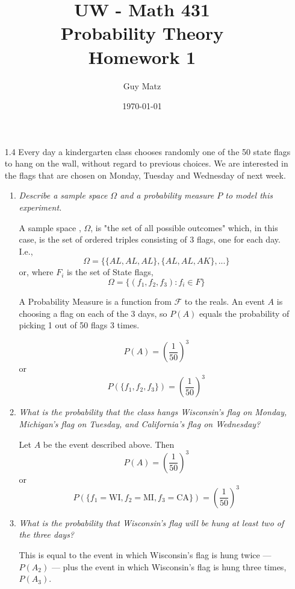 \documentclass[10pt]{article}
\title{UW - Math 431 \\
Probability Theory \\
Homework 1}
\author{Guy Matz}
\date{\today}
\begin{document}
\maketitle

\begin{itemize}

\item[1.4] Every day a kindergarten class chooses randomly one of the 50 state flags to hang on the wall, without regard to previous choices. We are interested in the flags that are chosen on Monday, Tuesday and Wednesday of next week.

  \begin{enumerate}
    \item \textit{Describe a sample space $\Omega$ and a probability
        measure $P$ to model this experiment.}

      A sample space , $\Omega$, is "the set of all possible
      outcomes" which, in this case, is the set of ordered triples
      consisting of 3 flags, one for each day. I.e.,
        \[ \Omega = \{\{AL, AL, AL\}, \{AL, AL, AK\}, ... \} \]
      or, where $F_i$ is the set of State flags,
      \[ \Omega = \{ ( f_1, f_2, f_3): f_i \in F \}  \]

      A Probability Measure is a function from $\mathcal{F}$ to the
      reals.  An event $A$ is choosing a flag on each of the 3 days,
      so $P(A)$ equals the probability of picking 1 out of 50 flags 3
      times.

        \[ P(A) = \left( \frac{1}{50} \right)^3 \]
        or
        \[ P(\{f_1, f_2, f_3\}) = \left( \frac{1}{50} \right)^3 \]

    \item \textit{What is the probability that the class hangs Wisconsin's flag
          on Monday, Michigan's flag on Tuesday, and California's flag on
        Wednesday?}

      Let $A$ be the event described above.  Then
        \[ P(A) = \left( \frac{1}{50} \right)^3 \]
        or
        \[ P(\{f_1=\text{WI}, f_2= \text{MI}, f_3 = \text{CA}\}) = \left( \frac{1}{50} \right)^3 \]

    \item  \textit{What is the probability that Wisconsin's flag will be hung at
          least two of the three days?}

      This is equal to the event in which Wisconsin's flag is hung twice
      --- $P(A_2)$ ---  plus the event in which Wisconsin's flag is hung
      three times, $P(A_3)$.


\end{enumerate}
\end{itemize}
\end{document}
